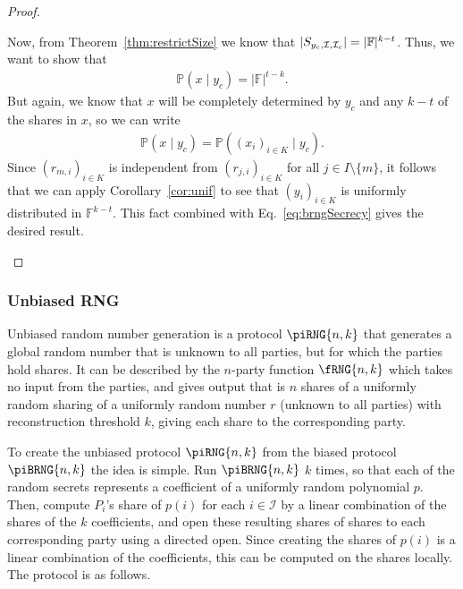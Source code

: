 \documentclass{article}
\theoremstyle{remark}
\newcommand{\F}{\mathbb{F}}
\renewcommand{\P}{\mathbb{P}}
\begin{document}
\begin{proof}
\begin{itemize}
			Now, from Theorem~\ref{thm:restrictSize} we know that
			$|\shareRestrict{y_c}{\mathcal{I}}{\mathcal{I}_c}| = |\F|^{k-t}$.
			Thus, we want to show that
			\begin{align*}
				\P(x \mid y_c) = |\F|^{t-k}.
			\end{align*}
			But again, we know that $x$ will be completely determined by $y_c$
			and any $k-t$ of the shares in $x$, so we can write
			\begin{align}\label{eq:brngSecrecy}
				\P(x \mid y_c) = \P({(x_i)}_{i \in K} \mid y_c).
			\end{align}
			Since ${(r_{m, i})}_{i \in K}$ is independent from ${(r_{j, i})}_{i
			\in K}$ for all $j \in I \setminus \{m\}$, it follows that we can
			apply Corollary~\ref{cor:unif} to see that ${(y_i)}_{i \in K}$ is
			uniformly distributed in $\F^{k-t}$. This fact combined with
			Eq.~\eqref{eq:brngSecrecy} gives the desired result.

	\end{itemize}
\end{proof}

\subsubsection{Unbiased RNG}

Unbiased random number generation is a protocol $\piRNG{n,k}$ that generates a
global random number that is unknown to all parties, but for which the parties
hold shares. It can be described by the $n$-party function $\fRNG{n,k}$ which
takes no input from the parties, and gives output that is $n$ shares of a
uniformly random sharing of a uniformly random number $r$ (unknown to all
parties) with reconstruction threshold $k$, giving each share to the
corresponding party.

To create the unbiased protocol $\piRNG{n,k}$ from the biased protocol
$\piBRNG{n,k}$ the idea is simple. Run $\piBRNG{n,k}$ $k$ times, so that each
of the random secrets represents a coefficient of a uniformly random polynomial
$p$. Then, compute $P_i$'s share of $p(i)$ for each $i \in \mathcal{I}$ by a
linear combination of the shares of the $k$ coefficients, and open these
resulting shares of shares to each corresponding party using a directed open.
Since creating the shares of $p(i)$ is a linear combination of the
coefficients, this can be computed on the shares locally. The protocol is as
follows.
\end{document}
